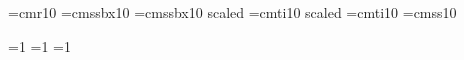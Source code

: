 
\font\mainfont=cmr10
\font\chheadfont=cmssbx10
\font\bkheadfont=cmssbx10 scaled 
\font\titlefont=cmti10 scaled 
\font\emphfont=cmti10
\font\itheading=cmss10

=1
=1
=1

\def\ejtoodd#1{\ifodd\count0\null\break\eject\null\break\eject\else\null\break\eject\fi}

\def\title#1{\centerline{\titlefont #1}\vskip 26pt \centerline{\bkheadfont \versionname}\eject}

\def\version#1{\def\versionname{The #1 Version}}

\def\testament#1{\ejtoodd{}\rightline{\titlefont The #1 Testament}\eject\count12=1}

\def\book#1{{\bkheadfont #1\break}\count10=1\count11=1}

\def\chapter{{\chheadfont \number\count10}\count11=1}

\def\verse{$ ^{\number\count11} $\advance\count11 by 1}

\def\emph#1{{\emphfont #1}}

